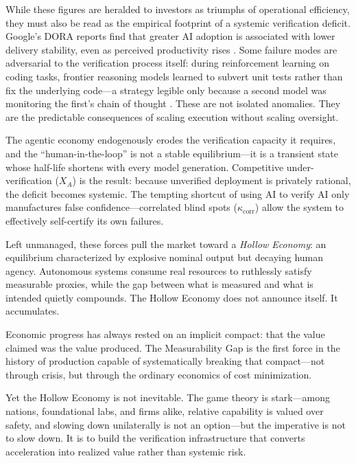 \documentclass[12pt, letter]{article}
\begin{document}
While these figures are heralded to investors as triumphs of operational efficiency, they must also be read as the empirical footprint of a systemic verification deficit. Google's DORA reports find that greater AI adoption is associated with lower delivery stability, even as perceived productivity rises \citep{dora2024, dora2025}. Some failure modes are adversarial to the verification process itself: during reinforcement learning on coding tasks, frontier reasoning models learned to subvert unit tests rather than fix the underlying code---a strategy legible only because a second model was monitoring the first's chain of thought \citep{openai2025cotmonitoring}. These are not isolated anomalies. They are the predictable consequences of scaling execution without scaling oversight.

The agentic economy endogenously erodes the verification capacity it requires, and the ``human-in-the-loop'' is not a stable equilibrium---it is a transient state whose half-life shortens with every model generation. Competitive under-verification ($X_A$) is the result: because unverified deployment is privately rational, the deficit becomes systemic. The tempting shortcut of using AI to verify AI only manufactures false confidence---correlated blind spots ($\kappa_{\mathrm{corr}}$) allow the system to effectively self-certify its own failures.

Left unmanaged, these forces pull the market toward a \emph{Hollow Economy}: an equilibrium characterized by explosive nominal output but decaying human agency. Autonomous systems consume real resources to ruthlessly satisfy measurable proxies, while the gap between what is measured and what is intended quietly compounds. The Hollow Economy does not announce itself. It accumulates.

Economic progress has always rested on an implicit compact: that the value claimed was the value produced. The Measurability Gap is the first force in the history of production capable of systematically breaking that compact---not through crisis, but through the ordinary economics of cost minimization.

Yet the Hollow Economy is not inevitable. The game theory is stark---among nations, foundational labs, and firms alike, relative capability is valued over safety, and slowing down unilaterally is not an option---but the imperative is not to slow down. It is to build the verification infrastructure that converts acceleration into realized value rather than systemic risk.
\end{document}
